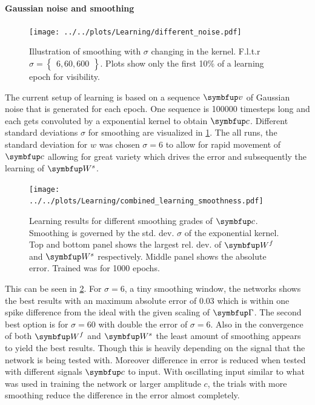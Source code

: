 \paragraph{Gaussian noise and smoothing}
\begin{figure}
	\centering
	\texttt{[image: ../../plots/Learning/different\_noise.pdf]}
	\caption{Illustration of smoothing with $\sigma$ changing in the kernel. F.l.t.r $\sigma = \begin{Bmatrix}
		6,60,600\end{Bmatrix}$. Plots show only the first 10\% of a learning epoch for visibility.}
	\label{fig:generate_input_seq}
\end{figure}
The current setup of learning is based on a sequence $\bmu{v}$ of Gaussian noise that is generated for each epoch. One sequence is 100000 timesteps long and each gets convoluted by a exponential kernel to obtain $\bmu{c}$. Different standard deviations $\sigma$ for smoothing are visualized in \cref{fig:generate_input_seq}. The all runs, the standard deviation for $w$ was chosen $\sigma = 6$ to allow for rapid movement of $\bmu{c}$ allowing for great variety which drives the error and subsequently the learning of $\bmu{W}^s$.\\
\begin{figure}
	\centering
	\texttt{[image: ../../plots/Learning/combined\_learning\_smoothness.pdf]}
	\caption{Learning results for different smoothing grades of $\bmu{c}$. Smoothing is governed by the std. dev. $\sigma$ of the exponential kernel. Top and bottom panel shows the largest rel. dev. of $\bmu{W}^f$ and $\bmu{W}^s$ respectively. Middle panel shows the absolute error. Trained was for 1000 epochs.}
	\label{fig:combined_learning_smoothness}
\end{figure}
This can be seen in \cref{fig:combined_learning_smoothness}. For $\sigma = 6$, a tiny smoothing window, the networks shows the best results with an maximum absolute error of $0.03$ which is within one spike difference from the ideal with the given scaling of $\bmu{\Gamma}$. The second best option is for $\sigma = 60$ with double the error of $\sigma = 6$. Also in the convergence of both $\bmu{W}^f$ and $\bmu{W}^s$ the least amount of smoothing appears to yield the best results. Though this is heavily depending on the signal that the network is being tested with.
Moreover difference in error is reduced when tested with different signals $\bmu{c}$ to input. With oscillating input similar to what was used in training the network or larger amplitude $c$, the trials with more smoothing reduce the difference in the error almost completely.\\
